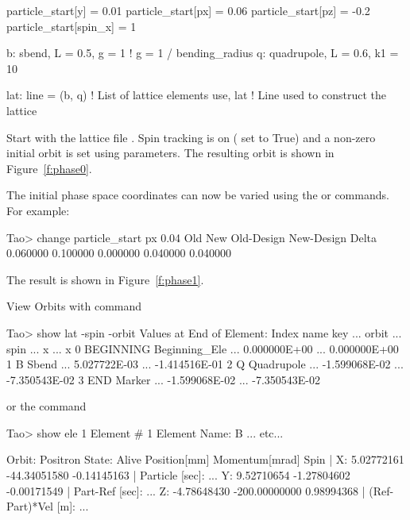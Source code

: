 \documentclass{hitec}     %
\begin{document}
{\begin{code}
particle_start[y] = 0.01
particle_start[px] = 0.06
particle_start[pz] = -0.2
particle_start[spin_x] = 1

b: sbend, L = 0.5, g = 1    ! g = 1 / bending_radius
q: quadrupole, L = 0.6, k1 = 10

lat: line = (b, q)      ! List of lattice elements
use, lat                ! Line used to construct the lattice
\end{code}

Start \tao with the lattice file .
Spin tracking is on ( set to True) and a non-zero initial orbit is set
using  parameters. The resulting orbit is shown in Figure~\ref{f:phase0}.

The initial phase space coordinates can now be varied using the  or 
commands. For example:
\begin{code}
Tao> change particle_start px 0.04
           Old           New    Old-Design    New-Design         Delta
      0.060000      0.100000      0.000000      0.040000      0.040000  
\end{code}

The result is shown in Figure~\ref{f:phase1}. 

View Orbits with  command

\begin{code}
Tao> show lat -spin -orbit
      Values at End of Element:
 Index  name      key           ...           orbit  ...          spin 
                                ...               x  ...             x 
     0  BEGINNING Beginning_Ele ...    0.000000E+00  ...  0.000000E+00 
     1  B         Sbend         ...    5.027722E-03  ... -1.414516E-01 
     2  Q         Quadrupole    ...   -1.599068E-02  ... -7.350543E-02 
     3  END       Marker        ...   -1.599068E-02  ... -7.350543E-02 
\end{code}

or the  command

\begin{code}
Tao> show ele 1
 Element #                1
 Element Name: B
... etc...

Orbit:  Positron   State: Alive
         Position[mm] Momentum[mrad]        Spin   |
  X:       5.02772161   -44.34051580  -0.14145163  | Particle [sec]:     ...
  Y:       9.52710654    -1.27804602  -0.00171549  | Part-Ref [sec]:     ...
  Z:      -4.78648430  -200.00000000   0.98994368  | (Ref-Part)*Vel [m]: ...
\end{code}

}
\end{document}
